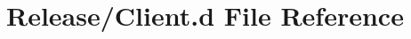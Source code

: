 \hypertarget{Release_2Client_8d}{}\section{Release/\+Client.d File Reference}
\label{Release_2Client_8d}
